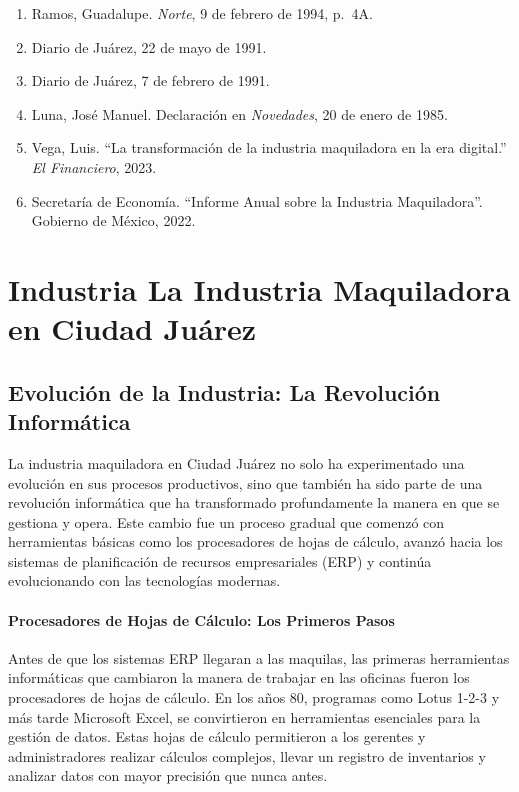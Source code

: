 \documentclass[
  10pt,
  letterpaper,
]{book}
\begin{document}
\begin{enumerate}
\item
  Ramos, Guadalupe. \emph{Norte}, 9 de febrero de 1994, p.~4A.
\item
  Diario de Juárez, 22 de mayo de 1991.
\item
  Diario de Juárez, 7 de febrero de 1991.
\item
  Luna, José Manuel. Declaración en \emph{Novedades}, 20 de enero de
  1985.
\item
  Vega, Luis. ``La transformación de la industria maquiladora en la era
  digital.'' \emph{El Financiero}, 2023.
\item
  Secretaría de Economía. ``Informe Anual sobre la Industria
  Maquiladora''. Gobierno de México, 2022.
\end{enumerate}


\chapter{Industria La Industria Maquiladora en Ciudad
Juárez}\label{industria-la-industria-maquiladora-en-ciudad-juuxe1rez}

\section{Evolución de la Industria: La Revolución
Informática}\label{evoluciuxf3n-de-la-industria-la-revoluciuxf3n-informuxe1tica}

La industria maquiladora en Ciudad Juárez no solo ha experimentado una
evolución en sus procesos productivos, sino que también ha sido parte de
una revolución informática que ha transformado profundamente la manera
en que se gestiona y opera. Este cambio fue un proceso gradual que
comenzó con herramientas básicas como los procesadores de hojas de
cálculo, avanzó hacia los sistemas de planificación de recursos
empresariales (ERP) y continúa evolucionando con las tecnologías
modernas.

\subsubsection{Procesadores de Hojas de Cálculo: Los Primeros
Pasos}\label{procesadores-de-hojas-de-cuxe1lculo-los-primeros-pasos}

Antes de que los sistemas ERP llegaran a las maquilas, las primeras
herramientas informáticas que cambiaron la manera de trabajar en las
oficinas fueron los procesadores de hojas de cálculo. En los años 80,
programas como Lotus 1-2-3 y más tarde Microsoft Excel, se convirtieron
en herramientas esenciales para la gestión de datos. Estas hojas de
cálculo permitieron a los gerentes y administradores realizar cálculos
complejos, llevar un registro de inventarios y analizar datos con mayor
precisión que nunca antes.
\end{document}
